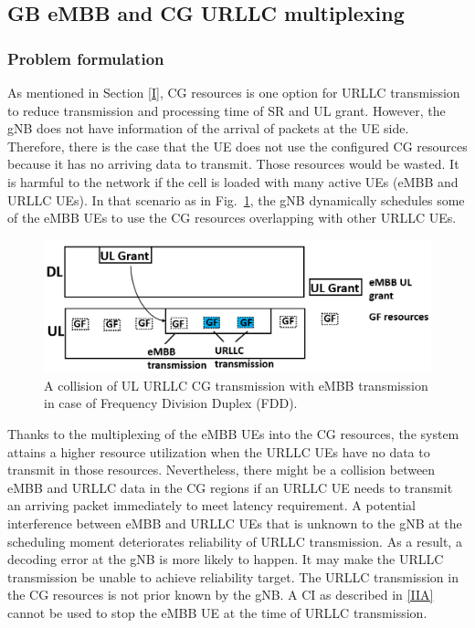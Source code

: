 \documentclass{ieeeaccess}
\begin{document}
\subsection{GB eMBB and CG URLLC multiplexing}\label{IIB}
\subsubsection{Problem formulation}\label{IIB1}
As mentioned in Section \ref{I}, CG resources is one option for URLLC transmission to reduce transmission and processing time of SR and UL grant. However, the gNB does not have information of the arrival of packets at the UE side. Therefore, there is the case that the UE does not use the configured CG resources because it has no arriving data to transmit. Those resources would be wasted. It is harmful to the network if the cell is loaded with many active UEs (eMBB and URLLC UEs). In that scenario as in Fig.~\ref{fig1}, the gNB dynamically schedules some of the eMBB UEs to use the CG resources overlapping with other URLLC UEs.

\begin{figure}[htbp]
\centerline{\includegraphics[scale=0.28]{fig1.PNG}}
\caption{A collision of UL URLLC CG transmission with eMBB transmission in case of Frequency Division Duplex (FDD).}
\label{fig1}
\end{figure}

Thanks to the multiplexing of the eMBB UEs into the CG resources, the system attains a higher resource utilization when the URLLC UEs have no data to transmit in those resources. Nevertheless, there might be a collision between eMBB and URLLC data in the CG regions if an URLLC UE needs to transmit an arriving packet immediately to meet latency requirement. A potential interference between eMBB and URLLC UEs that is unknown to the gNB at the scheduling moment deteriorates reliability of URLLC transmission. As a result, a decoding error at the gNB is more likely to happen. It may make the URLLC transmission be unable to achieve reliability target. The URLLC transmission in the CG resources is not prior known by the gNB. A CI as described in \ref{IIA} cannot be used to stop the eMBB UE at the time of URLLC transmission.
\end{document}
